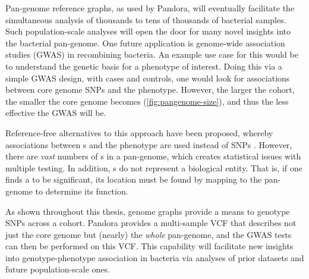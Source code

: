 
\noindent
Pan-genome reference graphs, as used by Pandora, will eventually facilitate the simultaneous analysis of thousands to tens of thousands of bacterial samples. Such population-scale analyses will open the door for many novel insights into the bacterial pan-genome. One future application is genome-wide association studies (GWAS) in recombining bacteria. An example use case for this would be to understand the genetic basis for a phenotype of interest. Doing this via a simple GWAS design, with cases and controls, one would look for associations between core genome SNPs and the phenotype. However, the larger the cohort, the smaller the core genome becomes (\autoref{fig:pangenome-size}), and thus the less effective the GWAS will be. 

Reference-free alternatives to this approach have been proposed, whereby associations between \kmer{}s and the phenotype are used instead of SNPs \cite{Jaillard2018,Lees2016Sequence}. However, there are \emph{vast} numbers of \kmer{}s in a pan-genome, which creates statistical issues with multiple testing. In addition, \kmer{}s do not represent a biological entity. That is, if one finds a \kmer{} to be significant, its location must be found by mapping to the pan-genome to determine its function.

As shown throughout this thesis, genome graphs provide a means to genotype SNPs across a cohort. Pandora provides a multi-sample VCF that describes not just the core genome but (nearly) the \emph{whole} pan-genome, and the GWAS tests can then be performed on this VCF. This capability will facilitate new insights into genotype-phenotype association in bacteria via analyses of prior datasets and future population-scale ones.



